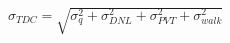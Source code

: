 \documentclass[preview, border=8pt, 12pt]{standalone}
\begin{document}
$\displaystyle 
\sigma_{TDC} = \sqrt{\sigma_{q}^2 + \sigma_{DNL}^2 + \sigma_{PVT}^2 + \sigma_{walk}^2}
$
\end{document}
